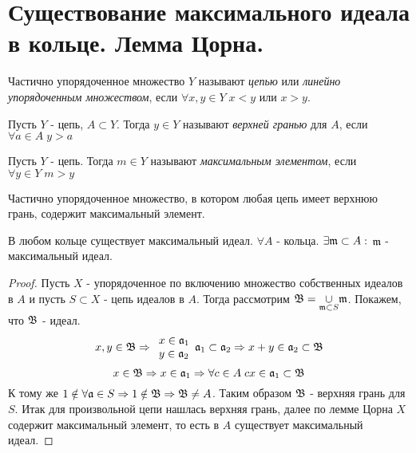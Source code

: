\section{Существование максимального идеала в кольце. Лемма Цорна.}

\begin{defn}
  Частично упорядоченное множество $ Y $ называют \emph{цепью} или \emph{линейно упорядоченным множеством}, если
  $ \forall x, y \in Y \; x < y $ или $ x > y $.
\end{defn}

\begin{defn}
  Пусть $ Y $ - цепь, $ A \subset Y $. 
  Тогда $ y \in Y $ называют \emph{верхней гранью} для $ A $, если $ \forall a \in A \; y > a $
\end{defn}

\begin{defn}
  Пусть $ Y $ - цепь. Тогда $ m \in Y $ называют \emph{максимальным элементом}, если $ \forall y \in Y \; m > y $
\end{defn}

\begin{lem}[Цорна]
  Частично упорядоченное множество, в котором любая цепь имеет верхнюю грань, содержит максимальный элемент.
\end{lem}

\begin{thm}
  В любом кольце существует максимальный идеал. \newline
  $ \forall A $ - кольца. $ \exists \mathfrak{m} \subset A :$ $ \mathfrak{m} $ - максимальный идеал.
\end{thm}
\begin{proof}
  Пусть $ X $ - упорядоченное по включению множество собственных идеалов в $ A $ и 
  пусть $ S \subset X $ - цепь идеалов в $ A $. Тогда рассмотрим 
  $ \mathfrak{B} = \underset{\mathfrak{m} \subset S}{\cup} \mathfrak{m} $. Покажем, что $ \mathfrak{B} $ - идеал.
  \[ x, y \in \mathfrak{B} \Rightarrow \begin{array}{l l}
                       x \in \mathfrak{a}_{1} \\
		       y \in \mathfrak{a}_{2}
		     \end{array}  
		     \mathfrak{a}_{1} \subset \mathfrak{a}_{2} \Rightarrow x + y \in \mathfrak{a}_{2} \subset \mathfrak{B} \]
		     \[ x \in \mathfrak{B} \Rightarrow x \in \mathfrak{a}_{1} \Rightarrow \forall c \in A \; cx \in \mathfrak{a}_{1} \subset \mathfrak{B} \]
  К тому же $ 1 \notin \forall \mathfrak{a} \in S \Rightarrow 1 \notin \mathfrak{B} \Rightarrow \mathfrak{B} \ne A $. Таким образом
  $ \mathfrak{B} $ - верхняя грань для $ S $. Итак для произвольной цепи нашлась верхняя грань, далее по лемме Цорна $ X $ содержит 
  максимальный элемент, то есть в $ A $ существует максимальный идеал.
\end{proof}

